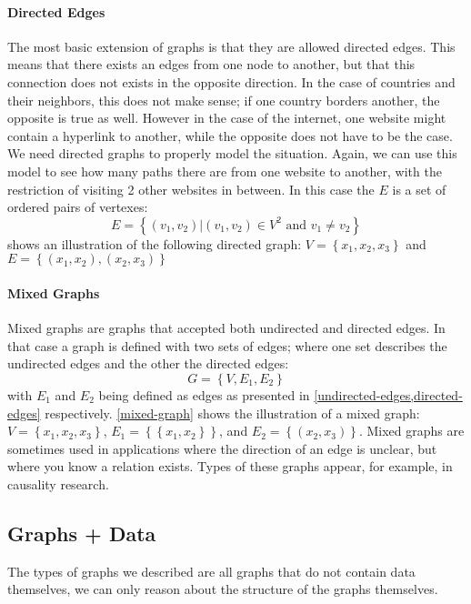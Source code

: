 \paragraph{Directed Edges} The most basic extension of graphs is that they are allowed directed edges. This means that there exists an edges from one node to another, but that this connection does not exists in the opposite direction. In the case of countries and their neighbors, this does not make sense; if one country borders another, the opposite is true as well. However in the case of the internet, one website might contain a hyperlink to another, while the opposite does not have to be the case. We need directed graphs to properly model the situation. Again, we can use this model to see how many paths there are from one website to another, with the restriction of visiting 2 other websites in between. In this case the $E$ is a set of ordered pairs of vertexes:
\begin{equation}
	E = \left\{\left(v_1, v_2\right) | \left(v_1, v_2\right) \in V^2\text{ and } v_1 \neq v_2 \right\}
	\label{directed-edges}
\end{equation}
 shows an illustration of the following directed graph:
$V = \left\{x_1, x_2, x_3\right\}$ and $E = \left\{\left(x_1, x_2\right), \left(x_2, x_3\right)\right\}$

\paragraph{Mixed Graphs}
Mixed graphs are graphs that accepted both undirected and directed edges. In that case a graph is defined with two sets of edges; where one set describes the undirected edges and the other the directed edges:
\begin{equation}
	G = \left\{V, E_1, E_2\right\}
\end{equation}
with $E_1$ and $E_2$ being defined as edges as presented in \cref{undirected-edges,directed-edges} respectively. \cref{mixed-graph} shows the illustration of a mixed graph:
$V = \left\{x_1, x_2, x_3\right\}$, $E_1 = \left\{\left\{x_1, x_2\right\}\right\}$, and $E_2 = \left\{\left(x_2, x_3\right)\right\}$.
Mixed graphs are sometimes used in applications where the direction of an edge is unclear, but where you know a relation exists. Types of these graphs appear, for example, in causality research. 

\subsection{Graphs + Data}
The types of graphs we described are all graphs that do not contain data themselves, we can only reason about the structure of the graphs themselves. 


